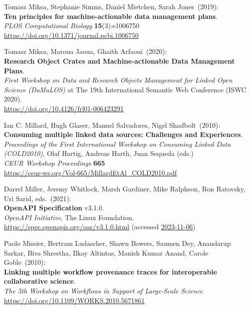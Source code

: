 \begin{thebibliography}{9}
Tomasz Miksa, Stephanie Simms, Daniel Mietchen, Sarah Jones~(2019): \\
\textbf{Ten principles for machine-actionable data management plans}.\\
\emph{PLOS Computational Biology} \textbf{15}(3):e1006750\\
\url{https://doi.org/10.1371/journal.pcbi.1006750}

Tomasz Miksa, Maroua Jaoua, Ghaith Arfaoui~(2020): \\
\textbf{Research Object Crates and Machine-actionable Data Management Plans}.\\
\emph{First Workshop on Data and Research Objects Management for Linked Open Science (DaMaLOS)} at The 19th International Semantic Web
Conference (ISWC 2020).\\
\url{https://doi.org/10.4126/frl01-006423291}

Ian C. Millard, Hugh Glaser, Manuel Salvadores, Nigel Shadbolt~(2010): \\
\textbf{Consuming multiple linked data sources: Challenges and Experiences}.\\
\emph{Proceedings of the First International Workshop on Consuming Linked Data (COLD2010)}, 
Olaf Hartig, Andreas Harth, Juan Sequeda (eds.) \\
\emph{CEUR Workshop Proceedings} \textbf{665}\\
\url{https://ceur-ws.org/Vol-665/MillardEtAl_COLD2010.pdf}

Darrel Miller, Jeremy Whitlock, Marsh Gardiner, Mike Ralphson, Ron Ratovsky, Uri Sarid, eds.~(2021): \\
\textbf{OpenAPI Specification} v3.1.0.\\
\emph{OpenAPI Initiative}, The Linux Foundation.\\
\url{https://spec.openapis.org/oas/v3.1.0.html} 
(accessed \href{https://web.archive.org/web/20231106014946/https://spec.openapis.org/oas/v3.1.0.html}{2023-11-06})

Paolo Missier, Bertram Ludascher, Shawn Bowers, Saumen Dey, Anandarup Sarkar, Biva Shrestha, Ilkay Altintas, Manish Kumar Anand, Carole Goble~(2010):\\
\textbf{Linking multiple workflow provenance traces for interoperable collaborative science}.\\
\emph{The 5th Workshop on Workflows in Support of Large-Scale Science} \\
\url{https://doi.org/10.1109/WORKS.2010.5671861}


\end{thebibliography}
